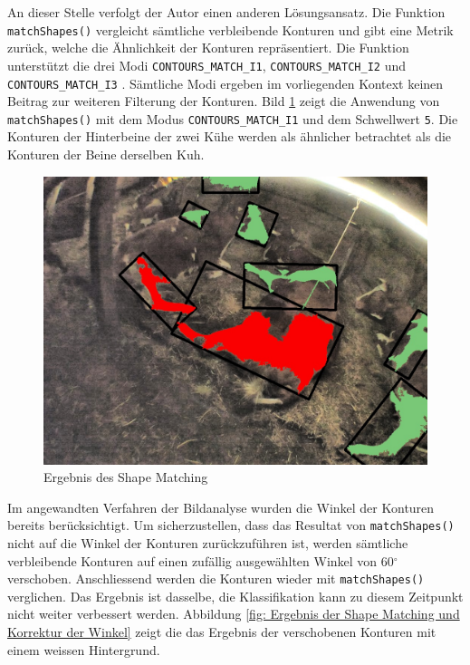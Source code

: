 An dieser Stelle verfolgt der Autor einen anderen Lösungsansatz. Die Funktion \texttt{matchShapes()} vergleicht sämtliche verbleibende Konturen und gibt eine Metrik zurück, welche die Ähnlichkeit der Konturen repräsentiert. Die Funktion unterstützt die drei Modi \texttt{CONTOURS_MATCH_I1}, \texttt{CONTOURS_MATCH_I2} und \texttt{CONTOURS_MATCH_I3} \citep[S. 392]{FernandezVillan2019}. Sämtliche Modi ergeben im vorliegenden Kontext keinen Beitrag zur weiteren Filterung der Konturen. Bild \ref{fig: Ergebnis des Shape Matching} zeigt die Anwendung von \texttt{matchShapes()} mit dem Modus \texttt{CONTOURS_MATCH_I1} und dem Schwellwert \texttt{5}. Die Konturen der Hinterbeine der zwei Kühe werden als ähnlicher betrachtet als die Konturen der Beine derselben Kuh. 

\begin{figure}[H]
	\center
	\includegraphics[scale=0.43]{Grafiken/entwicklung/31FilteredBySimilarity.jpg}
	\caption{Ergebnis des Shape Matching} 
	\label{fig: Ergebnis des Shape Matching} 
\end{figure}
Im angewandten Verfahren der Bildanalyse wurden die Winkel der Konturen bereits berücksichtigt. Um sicherzustellen, dass das Resultat von \texttt{matchShapes()} nicht auf die Winkel der Konturen zurückzuführen ist, werden sämtliche verbleibende Konturen auf einen zufällig ausgewählten Winkel von 60$^{\circ}$ verschoben. Anschliessend werden die Konturen wieder mit \texttt{matchShapes()} verglichen. Das Ergebnis ist dasselbe, die Klassifikation kann zu diesem Zeitpunkt nicht weiter verbessert werden. Abbildung \ref{fig: Ergebnis der Shape Matching und Korrektur der Winkel} zeigt die das Ergebnis der verschobenen Konturen mit einem weissen Hintergrund.
